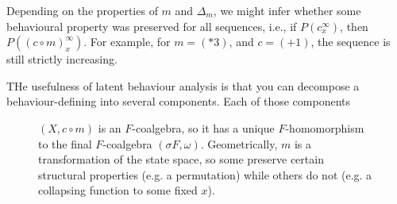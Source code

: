 \begin{definition}[Latent Coalgebra]

Depending on the properties of $m$ and $\Delta_m$, we might infer whether some behavioural property was preserved for all sequences, i.e., if $P(c^\infty_x)$, then $P((c\circ m)^\infty_x)$. For example, for $m=(*3)$, and $c=(+1)$, the sequence is still strictly increasing. 











THe usefulness of latent behaviour analysis is that you can decompose a behaviour-defining into several components. Each of those components 



\end{definition}
\begin{figure}
    \centering
    \caption{$(X,c\circ m)$ is an $F$-coalgebra, so it has a unique $F$-homomorphism to the final $F$-coalgebra $(\sigma F, \omega)$. Geometrically, $m$ is a transformation of the state space, so some preserve certain structural properties (e.g. a permutation) while others do not (e.g. a collapsing function to some fixed $x$).}
\end{figure}
